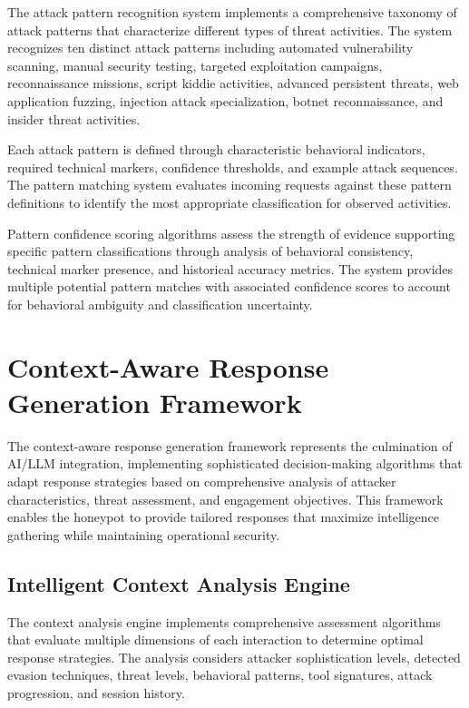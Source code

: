 The attack pattern recognition system implements a comprehensive taxonomy of attack patterns that characterize different types of threat activities. The system recognizes ten distinct attack patterns including automated vulnerability scanning, manual security testing, targeted exploitation campaigns, reconnaissance missions, script kiddie activities, advanced persistent threats, web application fuzzing, injection attack specialization, botnet reconnaissance, and insider threat activities.

Each attack pattern is defined through characteristic behavioral indicators, required technical markers, confidence thresholds, and example attack sequences. The pattern matching system evaluates incoming requests against these pattern definitions to identify the most appropriate classification for observed activities.

Pattern confidence scoring algorithms assess the strength of evidence supporting specific pattern classifications through analysis of behavioral consistency, technical marker presence, and historical accuracy metrics. The system provides multiple potential pattern matches with associated confidence scores to account for behavioral ambiguity and classification uncertainty.

\section{Context-Aware Response Generation Framework}

The context-aware response generation framework represents the culmination of AI/LLM integration, implementing sophisticated decision-making algorithms that adapt response strategies based on comprehensive analysis of attacker characteristics, threat assessment, and engagement objectives. This framework enables the honeypot to provide tailored responses that maximize intelligence gathering while maintaining operational security.

\subsection{Intelligent Context Analysis Engine}

The context analysis engine implements comprehensive assessment algorithms that evaluate multiple dimensions of each interaction to determine optimal response strategies. The analysis considers attacker sophistication levels, detected evasion techniques, threat levels, behavioral patterns, tool signatures, attack progression, and session history.

